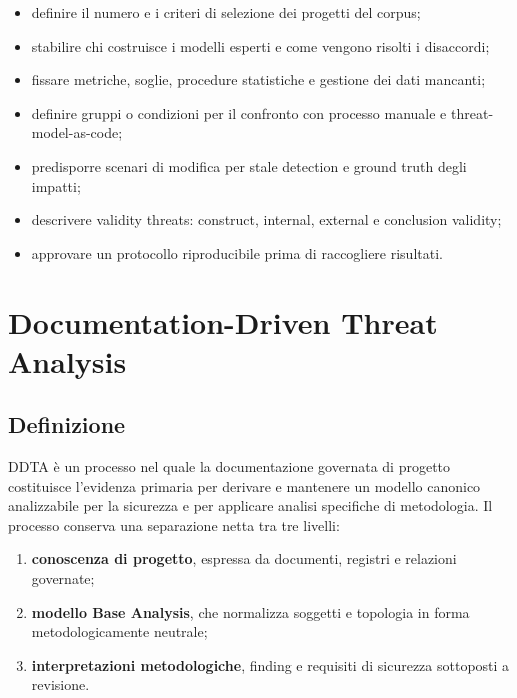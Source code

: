 \documentclass[12pt,a4paper,oneside]{report}
\newcommand{\statuslabel}[1]{\par\medskip\noindent{\Large\bfseries\sffamily #1}\par\medskip}
\begin{document}
\statuslabel{DA COMPLETARE}

\begin{pendingnote}
\begin{itemize}
  \item definire il numero e i criteri di selezione dei progetti del corpus;
  \item stabilire chi costruisce i modelli esperti e come vengono risolti i disaccordi;
  \item fissare metriche, soglie, procedure statistiche e gestione dei dati mancanti;
  \item definire gruppi o condizioni per il confronto con processo manuale e threat-model-as-code;
  \item predisporre scenari di modifica per stale detection e ground truth degli impatti;
  \item descrivere validity threats: construct, internal, external e conclusion validity;
  \item approvare un protocollo riproducibile prima di raccogliere risultati.
\end{itemize}
\end{pendingnote}

\chapter{Documentation-Driven Threat Analysis}

\section{Definizione}

DDTA è un processo nel quale la documentazione governata di progetto costituisce l'evidenza primaria per derivare e mantenere un modello canonico analizzabile per la sicurezza e per applicare analisi specifiche di metodologia. Il processo conserva una separazione netta tra tre livelli:

\begin{enumerate}
  \item \textbf{conoscenza di progetto}, espressa da documenti, registri e relazioni governate;
  \item \textbf{modello Base Analysis}, che normalizza soggetti e topologia in forma metodologicamente neutrale;
  \item \textbf{interpretazioni metodologiche}, finding e requisiti di sicurezza sottoposti a revisione.
\end{enumerate}
\end{document}
